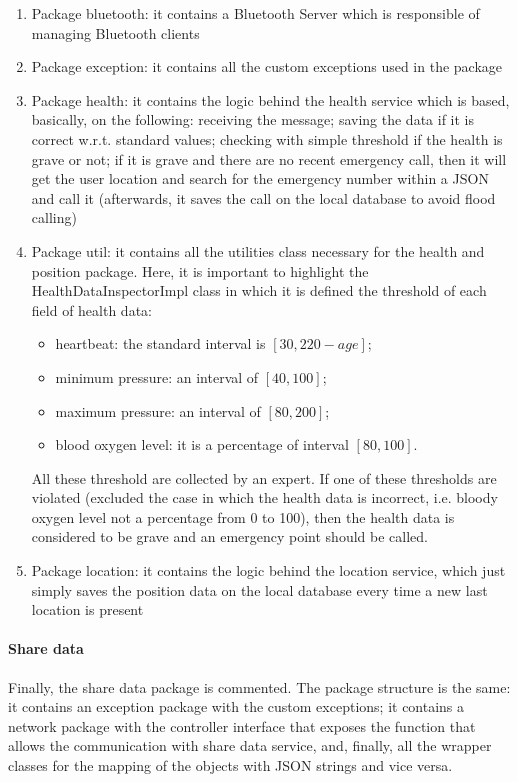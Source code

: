 \begin{enumerate}
\item Package bluetooth: it contains a Bluetooth Server which is responsible of managing Bluetooth clients
\item Package exception: it contains all the custom exceptions used in the package
\item Package health: it contains the logic behind the health service which is based, basically, on the following: receiving the message;
saving the data if it is correct w.r.t. standard values; checking with simple threshold if the health is grave or not; if it is grave and
there are no recent emergency call, then it will get the user location and search for the emergency number within a JSON and call it
(afterwards, it saves the call on the local database to avoid flood calling)
\item Package util: it contains all the utilities class necessary for the health and position package. Here, it is important to  highlight the HealthDataInspectorImpl class in which it is defined the threshold of each field of health data:
\begin{itemize}
	\item heartbeat: the standard interval is $ [30, 220-age] $;
	\item minimum pressure: an interval of $ [40, 100]$;
	\item maximum pressure: an interval of $ [80, 200]$;
	\item blood oxygen level: it is a percentage of interval $ [80,100]$.
\end{itemize}
All these threshold are collected by an expert. If one of these thresholds are violated (excluded the case in which the health data is incorrect, i.e. bloody oxygen level not a percentage from 0 to 100), then the health data is considered to be grave and an emergency point should be called.
\item Package location: it contains the logic behind the location service, which just simply saves the position data on the local database
every time a new last location is present
\end{enumerate}

\paragraph{Share data}
Finally, the share data package is commented. 
The package structure is the same: it contains an exception package with the custom exceptions; it contains a network package with the
controller interface that exposes the function that allows the communication with share data service, and, finally, all the wrapper classes
for the mapping of the objects with JSON strings and vice versa.

